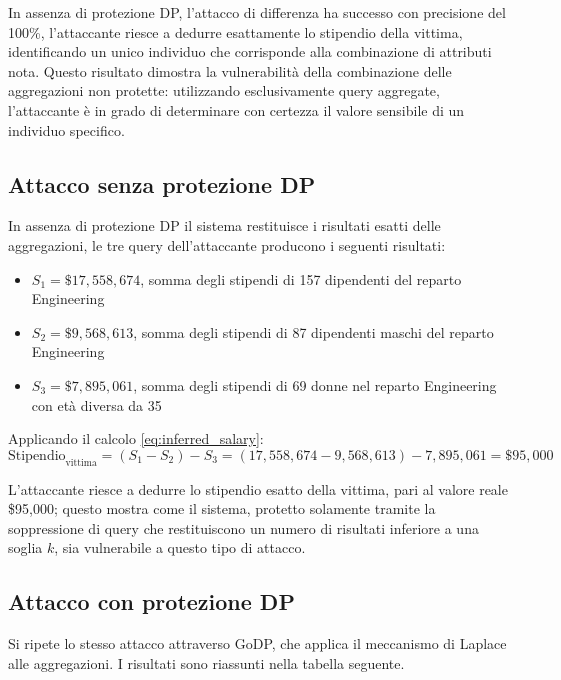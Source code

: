 In assenza di protezione DP, l'attacco di differenza ha successo con precisione del 100\%, l'attaccante riesce a dedurre esattamente lo stipendio della vittima, identificando un unico individuo che corrisponde alla combinazione di attributi nota. Questo risultato dimostra la vulnerabilità della combinazione delle aggregazioni non protette: utilizzando esclusivamente query aggregate, l'attaccante è in grado di determinare con certezza il valore sensibile di un individuo specifico.

\subsection{Attacco senza protezione DP}

In assenza di protezione DP il sistema restituisce i risultati esatti delle aggregazioni, le tre query dell'attaccante producono i seguenti risultati:
\begin{itemize}
    \item $S_1 = \$17,558,674$, somma degli stipendi di 157 dipendenti del reparto Engineering
    \item $S_2 = \$9,568,613$, somma degli stipendi di 87 dipendenti maschi del reparto Engineering
    \item $S_3 = \$7,895,061$, somma degli stipendi di 69 donne nel reparto Engineering con età diversa da 35
\end{itemize}

Applicando il calcolo \eqref{eq:inferred_salary}:
\begin{equation}
    \text{Stipendio}_{\text{vittima}} = (S_1 - S_2) - S_3 = (17{,}558{,}674 - 9{,}568{,}613) - 7{,}895{,}061 = \$95{,}000
\end{equation}

L'attaccante riesce a dedurre lo stipendio esatto della vittima, pari al valore reale \$95,000; questo mostra come il sistema, protetto solamente tramite la soppressione di query che restituiscono un numero di risultati inferiore a una soglia $k$, sia vulnerabile a questo tipo di attacco.

\subsection{Attacco con protezione DP}

Si ripete lo stesso attacco attraverso GoDP, che applica il meccanismo di Laplace alle aggregazioni. I risultati sono riassunti nella tabella seguente.


